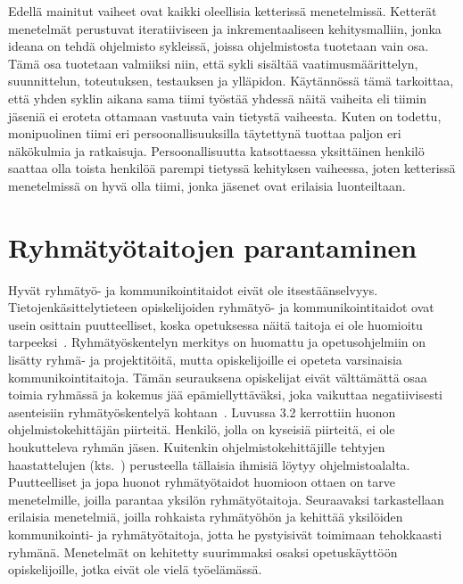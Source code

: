 \documentclass[finnish]{../tktltiki2}
\theoremstyle{definition}
\theoremstyle{remark}
\begin{document}
Edellä mainitut vaiheet ovat kaikki oleellisia ketterissä menetelmissä. Ketterät menetelmät perustuvat iteratiiviseen ja inkrementaaliseen kehitysmalliin, jonka ideana on tehdä ohjelmisto sykleissä, joissa ohjelmistosta tuotetaan vain osa. Tämä osa tuotetaan valmiiksi niin, että sykli sisältää vaatimusmäärittelyn, suunnittelun, toteutuksen, testauksen ja ylläpidon. Käytännössä tämä tarkoittaa, että yhden syklin aikana sama tiimi työstää yhdessä näitä vaiheita eli tiimin jäseniä ei eroteta ottamaan vastuuta vain tietystä vaiheesta. Kuten on todettu, monipuolinen tiimi eri persoonallisuuksilla täytettynä tuottaa paljon eri näkökulmia ja ratkaisuja. Persoonallisuutta katsottaessa yksittäinen henkilö saattaa olla toista henkilöä parempi tietyssä kehityksen vaiheessa, joten ketterissä menetelmissä on hyvä olla tiimi, jonka jäsenet ovat erilaisia luonteiltaan.

\section{Ryhmätyötaitojen parantaminen}

Hyvät ryhmätyö- ja kommunikointitaidot eivät ole itsestäänselvyys. Tietojenkäsittelytieteen opiskelijoiden ryhmätyö- ja kommunikointitaidot ovat usein osittain puutteelliset, koska opetuksessa näitä taitoja ei ole huomioitu tarpeeksi~\cite{Cushing:2003:TBP:948785.948797,Jun:2010,Waite:2004:SCV:1028174.971308}. Ryhmätyöskentelyn merkitys on huomattu ja
opetusohjelmiin on lisätty ryhmä- ja projektitöitä, mutta opiskelijoille ei opeteta varsinaisia kommunikointitaitoja. Tämän seurauksena opiskelijat eivät välttämättä osaa toimia ryhmässä ja kokemus jää epämiellyttäväksi, joka vaikuttaa negatiivisesti asenteisiin ryhmätyöskentelyä kohtaan~\cite{1158709}.
Luvussa 3.2 kerrottiin huonon ohjelmistokehittäjän piirteitä. Henkilö, jolla on kyseisiä piirteitä, ei ole houkutteleva ryhmän jäsen. Kuitenkin ohjelmistokehittäjille tehtyjen haastattelujen (kts.~\cite{Begel:2008:PPW:1414004.1414026,Hall:2007:CNT:1235000.1235043}) perusteella tällaisia ihmisiä löytyy ohjelmistoalalta.\\

Puutteelliset ja jopa huonot ryhmätyötaidot huomioon ottaen on tarve menetelmille, joilla parantaa yksilön ryhmätyötaitoja.
Seuraavaksi tarkastellaan erilaisia menetelmiä, joilla
rohkaista ryhmätyöhön ja kehittää yksilöiden kommunikointi- ja ryhmätyötaitoja, jotta he pystyisivät toimimaan tehokkaasti ryhmänä. Menetelmät on
kehitetty suurimmaksi osaksi opetuskäyttöön opiskelijoille,
jotka eivät ole vielä työelämässä.
\end{document}
